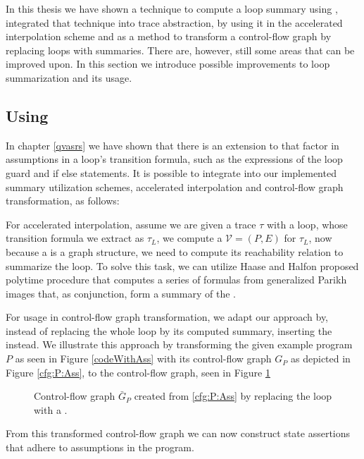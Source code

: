 
In this thesis we have shown a technique to compute a loop summary using \qvasr, integrated that technique into trace abstraction, by using it in the accelerated interpolation scheme and as a method to transform a control-flow graph by replacing loops with summaries. There are, however, still some areas that can be improved upon. In this section we introduce possible improvements to \qvasr loop summarization and its usage. \\ \par
\subsection{Using \qvasrs}
In chapter \ref{qvasrs} we have shown that there is an extension to \qvasr that factor in assumptions in a loop's transition formula, such as the expressions of the loop guard and if else statements. It is possible to integrate \qvasrs into our implemented summary utilization schemes, accelerated interpolation and control-flow graph transformation, as follows: \\ \par
For accelerated interpolation, assume we are given a trace $\tau$ with a loop, whose transition formula we extract as $\tau_L$, we compute a \qvasrs $\mathcal{V} = (P, E)$ for $\tau_L$, now because a \qvasrs is a graph structure, we need to compute its reachability relation to summarize the loop. To solve this task, we can utilize Haase and Halfon \cite{DBLP:conf/rp/HaaseH14} proposed polytime procedure that computes a series of formulas from generalized Parikh images that, as conjunction, form a summary of the \qvasrs. \\ \par
For \qvasrs usage in control-flow graph transformation, we adapt our approach by, instead of replacing the whole loop by its computed summary, inserting the \qvasrs instead. We illustrate this approach by transforming the given example program $P$ as seen in Figure \ref{codeWithAss} with its control-flow graph $G_P$ as depicted in Figure \ref{cfg:P:Ass}, to the control-flow graph, seen in Figure \ref{qvasrs_cfg}
\begin{figure}[H]
	
	\label{qvasrs_cfg}
	\caption{Control-flow graph $\bar{G}_P$ created from \ref{cfg:P:Ass} by replacing the loop with a \qvasrs.}
\end{figure}
From this transformed control-flow graph we can now construct state assertions that adhere to assumptions in the program.
